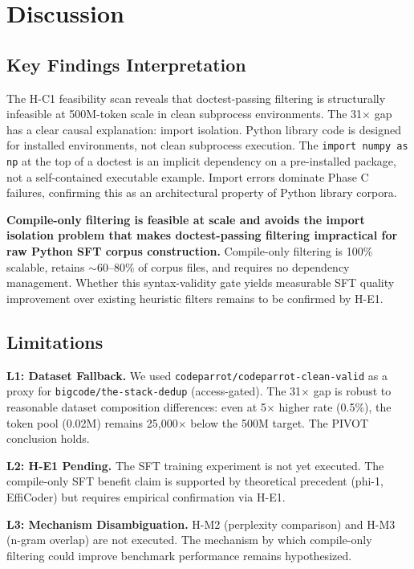\section{Discussion}
\label{sec:discussion}

\subsection{Key Findings Interpretation}

The H-C1 feasibility scan reveals that doctest-passing filtering is structurally infeasible
at 500M-token scale in clean subprocess environments. The 31$\times$ gap has a clear causal
explanation: import isolation. Python library code is designed for installed environments,
not clean subprocess execution. The \texttt{import numpy as np} at the top of a doctest is
an implicit dependency on a pre-installed package, not a self-contained executable example.
Import errors dominate Phase C failures, confirming this as an architectural property of
Python library corpora.

\textbf{Compile-only filtering is feasible at scale and avoids the import isolation problem
that makes doctest-passing filtering impractical for raw Python SFT corpus construction.}
Compile-only filtering is 100\% scalable, retains $\sim$60--80\% of corpus files, and
requires no dependency management. Whether this syntax-validity gate yields measurable SFT
quality improvement over existing heuristic filters remains to be confirmed by H-E1.

\subsection{Limitations}

\textbf{L1: Dataset Fallback.} We used \texttt{codeparrot/codeparrot-clean-valid} as a proxy
for \texttt{bigcode/the-stack-dedup} (access-gated). The 31$\times$ gap is robust to
reasonable dataset composition differences: even at 5$\times$ higher rate (0.5\%), the token
pool (0.02M) remains 25,000$\times$ below the 500M target. The PIVOT conclusion holds.

\textbf{L2: H-E1 Pending.} The SFT training experiment is not yet executed. The compile-only
SFT benefit claim is supported by theoretical precedent (phi-1, EffiCoder) but requires
empirical confirmation via H-E1.

\textbf{L3: Mechanism Disambiguation.} H-M2 (perplexity comparison) and H-M3 (n-gram overlap)
are not executed. The mechanism by which compile-only filtering could improve benchmark
performance remains hypothesized.

